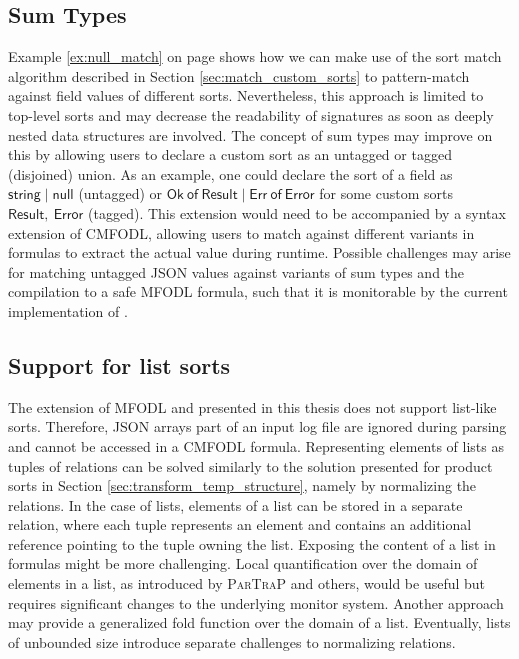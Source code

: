 \subsection{Sum Types}
Example \ref{ex:null_match} on page \pageref{ex:null_match} shows how we can make use of the sort match algorithm described in Section \ref{sec:match_custom_sorts} to pattern-match against field values of different sorts. Nevertheless, this approach is limited to top-level sorts and may decrease the readability of signatures as soon as deeply nested data structures are involved. The concept of sum types may improve on this by allowing users to declare a custom sort as an untagged or tagged (disjoined) union. As an example, one could declare the sort of a field as $\mathsf{string \mid null}$ (untagged) or $\mathsf{Ok\ of\ Result \mid Err\ of\ Error}$ for some custom sorts $\mathsf{Result},\ \mathsf{Error}$ (tagged). This extension would need to be accompanied by a syntax extension of CMFODL, allowing users to match against different variants in formulas to extract the actual value during runtime. Possible challenges may arise for matching untagged JSON values against variants of sum types and the compilation to a safe MFODL formula, such that it is monitorable by the current implementation of \MonPolyN.

\subsection{Support for list sorts}
The extension of MFODL and \MonPoly presented in this thesis does not support list-like sorts. Therefore, JSON arrays part of an input log file are ignored during parsing and cannot be accessed in a CMFODL formula. Representing elements of lists as tuples of relations can be solved similarly to the solution presented for product sorts in Section \ref{sec:transform_temp_structure}, namely by normalizing the relations. In the case of lists, elements of a list can be stored in a separate relation, where each tuple represents an element and contains an additional reference pointing to the tuple owning the list. Exposing the content of a list in formulas might be more challenging. Local quantification over the domain of elements in a list, as introduced by \textsc{ParTraP} \cite{bleinExtendingSpecificationPatterns2018} and others, would be useful but requires significant changes to the underlying monitor system. Another approach may provide a generalized fold function over the domain of a list. Eventually, lists of unbounded size introduce separate challenges to normalizing relations.


